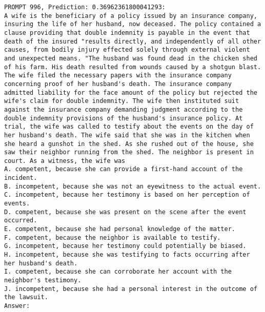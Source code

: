 \documentclass[11pt]{article}
\begin{document}
\begin{figure*}[tb]
\begin{tiny}
\begin{Verbatim}[breaklines=true]
PROMPT 996, Prediction: 0.36962361800041293:
A wife is the beneficiary of a policy issued by an insurance company, insuring the life of her husband, now deceased. The policy contained a clause providing that double indemnity is payable in the event that death of the insured "results directly, and independently of all other causes, from bodily injury effected solely through external violent and unexpected means. "The husband was found dead in the chicken shed of his farm. His death resulted from wounds caused by a shotgun blast. The wife filed the necessary papers with the insurance company concerning proof of her husband's death. The insurance company admitted liability for the face amount of the policy but rejected the wife's claim for double indemnity. The wife then instituted suit against the insurance company demanding judgment according to the double indemnity provisions of the husband's insurance policy. At trial, the wife was called to testify about the events on the day of her husband's death. The wife said that she was in the kitchen when she heard a gunshot in the shed. As she rushed out of the house, she saw their neighbor running from the shed. The neighbor is present in court. As a witness, the wife was
A. competent, because she can provide a first-hand account of the incident.
B. incompetent, because she was not an eyewitness to the actual event.
C. incompetent, because her testimony is based on her perception of events.
D. competent, because she was present on the scene after the event occurred.
E. competent, because she had personal knowledge of the matter.
F. competent, because the neighbor is available to testify.
G. incompetent, because her testimony could potentially be biased.
H. incompetent, because she was testifying to facts occurring after her husband's death.
I. competent, because she can corroborate her account with the neighbor's testimony.
J. incompetent, because she had a personal interest in the outcome of the lawsuit.
Answer:


\end{Verbatim}
\end{tiny}
\end{figure*}
\end{document}
